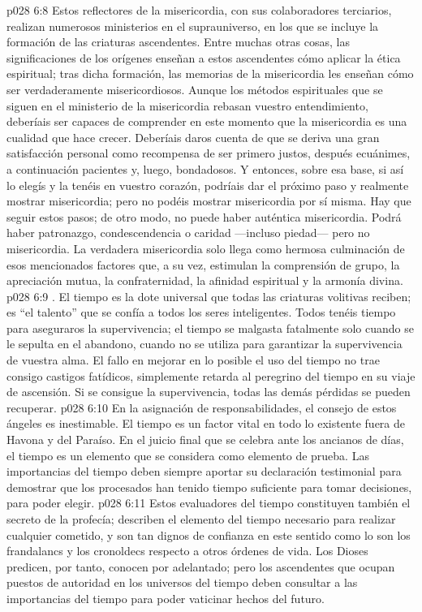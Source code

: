 \vs p028 6:8 \pc Estos reflectores de la misericordia, con sus colaboradores terciarios, realizan numerosos ministerios en el suprauniverso, en los que se incluye la formación de las criaturas ascendentes. Entre muchas otras cosas, las significaciones de los orígenes enseñan a estos ascendentes cómo aplicar la ética espiritual; tras dicha formación, las memorias de la misericordia les enseñan cómo ser verdaderamente misericordiosos. Aunque los métodos espirituales que se siguen en el ministerio de la misericordia rebasan vuestro entendimiento, deberíais ser capaces de comprender en este momento que la misericordia es una cualidad que hace crecer. Deberíais daros cuenta de que se deriva una gran satisfacción personal como recompensa de ser primero justos, después ecuánimes, a continuación pacientes y, luego, bondadosos. Y entonces, sobre esa base, si así lo elegís y la tenéis en vuestro corazón, podríais dar el próximo paso y realmente mostrar misericordia; pero no podéis mostrar misericordia por sí misma. Hay que seguir estos pasos; de otro modo, no puede haber auténtica misericordia. Podrá haber patronazgo, condescendencia o caridad ---incluso piedad--- pero no misericordia. La verdadera misericordia solo llega como hermosa culminación de esos mencionados factores que, a su vez, estimulan la comprensión de grupo, la apreciación mutua, la confraternidad, la afinidad espiritual y la armonía divina.
\vs p028 6:9 . El tiempo es la dote universal que todas las criaturas volitivas reciben; es “el talento” que se confía a todos los seres inteligentes. Todos tenéis tiempo para aseguraros la supervivencia; el tiempo se malgasta fatalmente solo cuando se le sepulta en el abandono, cuando no se utiliza para garantizar la supervivencia de vuestra alma. El fallo en mejorar en lo posible el uso del tiempo no trae consigo castigos fatídicos, simplemente retarda al peregrino del tiempo en su viaje de ascensión. Si se consigue la supervivencia, todas las demás pérdidas se pueden recuperar.
\vs p028 6:10 En la asignación de responsabilidades, el consejo de estos ángeles es inestimable. El tiempo es un factor vital en todo lo existente fuera de Havona y del Paraíso. En el juicio final que se celebra ante los ancianos de días, el tiempo es un elemento que se considera como elemento de prueba. Las importancias del tiempo deben siempre aportar su declaración testimonial para demostrar que los procesados han tenido tiempo suficiente para tomar decisiones, para poder elegir.
\vs p028 6:11 Estos evaluadores del tiempo constituyen también el secreto de la profecía; describen el elemento del tiempo necesario para realizar cualquier cometido, y son tan dignos de confianza en este sentido como lo son los frandalancs y los cronoldecs respecto a otros órdenes de vida. Los Dioses predicen, por tanto, conocen por adelantado; pero los ascendentes que ocupan puestos de autoridad en los universos del tiempo deben consultar a las importancias del tiempo para poder vaticinar hechos del futuro.
